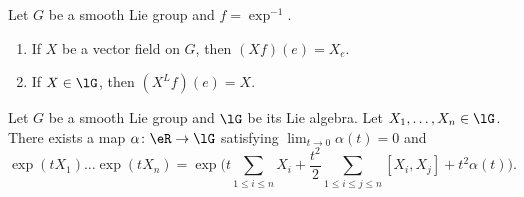 \begin{lemma}	\label{LEMooVWBIooTxzPIN}
	Let \( G\) be a smooth Lie group and \( f=\exp^{-1}\).
	\begin{enumerate}
		\item
		      If \( X\) be a vector field on \( G\), then \( (Xf)(e)=X_e \).
		\item		\label{ITEMooZCKFooIKbIRx}
		      If \( X\in\lG\), then \( (X^Lf)(e)=X\).
	\end{enumerate}
\end{lemma}


\begin{proposition}	\label{PROPooPTYCooCuHEbO}
	Let \( G\) be a smooth Lie group and \( \lG \) be its Lie algebra. Let \( X_1,\ldots,X_n\in\lG\). There exists a map \(\alpha \colon \eR\to \lG  \) satisfying \( \lim_{t\to 0}\alpha(t)=0\) and
	\begin{equation}
		\exp(tX_1)\ldots \exp(tX_n)=\exp\Big(  t\sum_{1\leq i\leq n}X_i+\frac{ t^2 }{2}\sum_{1\leq i\leq j\leq n}[X_i,X_j]+t^2\alpha(t)   \Big).
	\end{equation}
\end{proposition}

